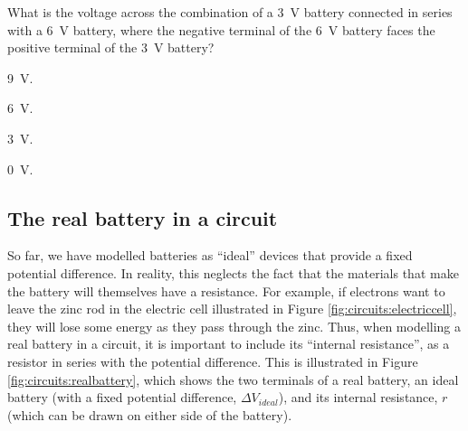 \begin{checkpoint}{}
 \begin{MCquestion}{What is the voltage across the combination of a \SI{3}{V} battery connected in series with a \SI{6}{V} battery, where the negative terminal of the \SI{6}{V} battery faces the positive terminal of the \SI{3}{V} battery?}
\item \SI{9}{V}. \correct
\item \SI{6}{V}.
\item \SI{3}{V}.
\item \SI{0}{V}.
 \end{MCquestion}
\end{checkpoint}
\subsection{The real battery in a circuit}
So far, we have modelled batteries as ``ideal'' devices that provide a fixed potential difference. In reality, this neglects the fact that the materials that make the battery will themselves have a resistance. For example, if electrons want to leave the zinc rod in the electric cell illustrated in Figure \ref{fig:circuits:electriccell}, they will lose some energy as they pass through the zinc. Thus, when modelling a real battery in a circuit, it is important to include its ``internal resistance'', as a resistor in series with the potential difference. This is illustrated in Figure \ref{fig:circuits:realbattery}, which shows the two terminals of a real battery, an ideal battery (with a fixed potential difference, $\Delta V_{ideal}$), and its internal resistance, $r$ (which can be drawn on either side of the battery). 


